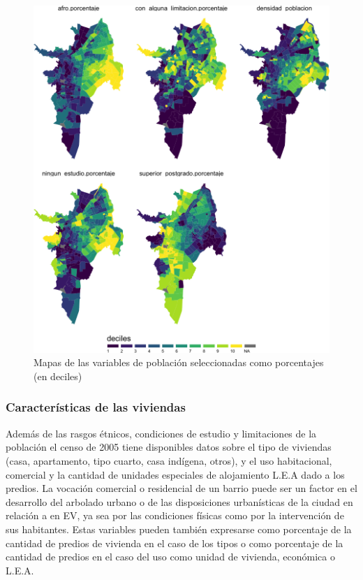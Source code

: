 \documentclass[12pt,]{book}
\begin{document}
\begin{figure}
\includegraphics[width=1\linewidth]{tesis-unigis_files/figure-latex/mapas-poblacion-mod-deciles-1} \caption{Mapas de las variables de población seleccionadas como porcentajes (en deciles)}\label{fig:mapas-poblacion-mod-deciles}
\end{figure}

\subsubsection{Características de las
viviendas}\label{caracteristicas-de-las-viviendas}

Además de las rasgos étnicos, condiciones de estudio y limitaciones de
la población el censo de 2005 tiene disponibles datos sobre el tipo de
viviendas (casa, apartamento, tipo cuarto, casa indígena, otros), y el
uso habitacional, comercial y la cantidad de unidades especiales de
alojamiento L.E.A dado a los predios. La vocación comercial o
residencial de un barrio puede ser un factor en el desarrollo del
arbolado urbano o de las disposiciones urbanísticas de la ciudad en
relación a en EV, ya sea por las condiciones físicas como por la
intervención de sus habitantes. Estas variables pueden también
expresarse como porcentaje de la cantidad de predios de vivienda en el
caso de los tipos o como porcentaje de la cantidad de predios en el caso
del uso como unidad de vivienda, económica o L.E.A.
\end{document}
